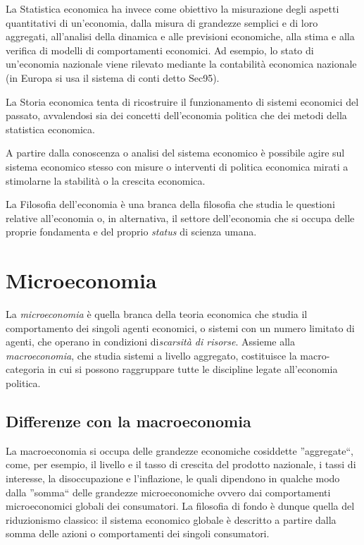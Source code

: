 La Statistica economica ha invece come obiettivo la misurazione degli 
aspetti quantitativi di un'economia, dalla misura di grandezze semplici e di 
loro aggregati, all'analisi della dinamica e alle previsioni economiche, alla 
stima e alla verifica di modelli di comportamenti economici. Ad esempio, lo 
stato di un'economia nazionale viene rilevato mediante la contabilità economica 
nazionale (in Europa si usa il sistema di conti detto Sec95).

La Storia economica tenta di ricostruire il funzionamento di sistemi 
economici del passato, avvalendosi sia dei concetti dell'economia politica 
che dei metodi della statistica economica.

A partire dalla conoscenza o analisi del sistema economico è possibile agire 
sul sistema economico stesso con misure o interventi di politica economica 
mirati a stimolarne la stabilità o la crescita economica.

La Filosofia dell'economia è una branca della filosofia che studia le 
questioni relative all'economia o, in alternativa, il settore dell'economia che 
si occupa delle proprie fondamenta e del proprio \emph{status} di scienza 
umana.

\section{Microeconomia}
\label{sec:modelli_microeconomia}

La \emph{microeconomia} è quella branca della teoria economica che studia il 
comportamento dei singoli agenti economici, o sistemi con un numero limitato di 
agenti, che operano in condizioni di\emph{scarsità di risorse}. Assieme alla 
\emph{macroeconomia}, che studia sistemi a livello aggregato, costituisce la 
macro-categoria in cui si possono raggruppare tutte le discipline legate 
all'economia politica.

\subsection{Differenze con la macroeconomia}

La macroeconomia si 
occupa delle grandezze economiche cosiddette ''aggregate``, come, per esempio, 
il livello e il tasso di crescita del prodotto nazionale, i tassi di 
interesse, la disoccupazione e l'inflazione, le quali dipendono in 
qualche modo dalla ''somma`` delle grandezze microeconomiche ovvero dai 
comportamenti microeconomici globali dei consumatori. La filosofia di fondo è 
dunque quella del riduzionismo classico: il sistema economico globale è 
descritto a partire dalla somma delle azioni o comportamenti dei singoli 
consumatori.

